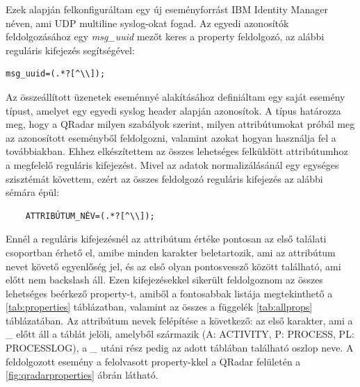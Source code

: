 Ezek alapján felkonfiguráltam egy új eseményforrást IBM Identity Manager néven, ami UDP multiline syslog-okat fogad. Az egyedi azonosítók feldolgozásához egy \textit{msg\_uuid} mezőt keres a property feldolgozó, az alábbi reguláris kifejezés segítségével: 

\begin{lstlisting}
msg_uuid=(.*?[^\\]);
\end{lstlisting}

Az összeállított üzenetek eseménnyé alakításához definiáltam egy saját esemény típust, amelyet egy egyedi syslog header alapján azonosítok. A típus határozza meg, hogy a QRadar milyen szabályok szerint, milyen attribútumokat próbál meg az azonosított eseményből feldolgozni, valamint azokat hogyan használja fel a továbbiakban. Ehhez elkészítettem az összes lehetséges felküldött attribútumhoz a megfelelő reguláris kifejezést. Mivel az adatok normalizálásánál egy egységes szisztémát követtem, ezért az összes feldolgozó reguláris kifejezés az alábbi sémára épül:

\begin{lstlisting}
	ATTRIBÚTUM_NÉV=(.*?[^\\]);
\end{lstlisting}

Ennél a reguláris kifejezésnél az attribútum értéke pontosan az első találati csoportban érhető el, amibe minden karakter beletartozik, ami az attribútum nevet követő egyenlőség jel, és az első olyan pontosvessző között található, ami előtt nem backslash áll. Ezen kifejezésekkel sikerült feldolgoznom az összes lehetséges beérkező property-t, amiből a fontosabbak listája megtekinthető a \ref{tab:properties} táblázatban, valamint az összes a függelék \ref{tab:allprops} táblázatában. Az attribútum nevek felépítése a következő: az első karakter, ami a \_ előtt áll a táblát jelöli, amelyből származik (A: ACTIVITY, P: PROCESS, PL: PROCESSLOG), a \_ utáni rész pedig az adott táblában található oszlop neve. A feldolgozott esemény a felolvasott property-kkel a QRadar felületén a \ref{fig:qradarproperties} ábrán látható.

